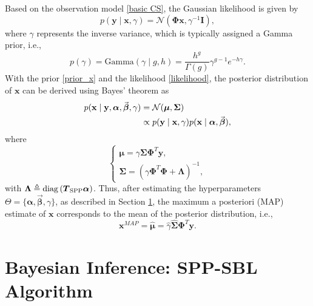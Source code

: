 \documentclass[lettersize,journal]{IEEEtran}
\DeclareMathOperator{\diag}{diag}
\theoremstyle{remark}
\begin{document}
Based on the observation model \eqref{basic CS}, the Gaussian likelihood is given by  
\begin{equation}
	p(\mathbf{y} \mid \mathbf{x}, \gamma)=\mathcal{N}(\boldsymbol{\Phi}\mathbf{x}, \gamma^{-1}\mathbf{I}),\label{likelihood}
\end{equation}  
where \( \gamma \) represents the inverse variance, which is typically assigned a Gamma prior, i.e., 
\begin{equation}
	p(\gamma)=\text{Gamma}(\gamma\mid g,h)=\frac{h^g}{\Gamma(g)}\gamma^{g-1} e^{-h\gamma}.\label{prior_gamma}
\end{equation}
With the prior \eqref{prior_x} and the likelihood \eqref{likelihood}, the posterior distribution of \( \mathbf{x} \) can be derived using Bayes' theorem as  
\begin{align}
	p(\mathbf{x} \mid \mathbf{y}, \boldsymbol{\alpha}, \vec{\boldsymbol{\beta}},\gamma) 
	&= \mathcal{N}(\boldsymbol{\mu}, \boldsymbol{\Sigma})\label{posterior_x}\\
	&\propto p(\mathbf{y} \mid \mathbf{x}, \gamma) p(\mathbf{x} \mid \boldsymbol{\alpha}, \vec{\boldsymbol{\beta}}),\notag
\end{align}  
where  
\begin{equation}
	\left\{
	\begin{array}{l}
		\boldsymbol{\mu} = \gamma\boldsymbol{\Sigma}\boldsymbol{\Phi}^T \mathbf{y}, \\  
		\boldsymbol{\Sigma} = \left(\gamma\boldsymbol{\Phi}^T\boldsymbol{\Phi}+\boldsymbol{\Lambda}\right)^{-1},\label{posterior}
	\end{array}
	\right.
\end{equation}  
with \( \boldsymbol{\Lambda} \triangleq \diag \left( \boldsymbol{T}_{\rm SPP} \boldsymbol{\alpha} \right) \). Thus, after estimating the hyperparameters \( \Theta = \{\boldsymbol{\alpha}, \vec{\boldsymbol{\beta}}, \gamma\} \), as described in Section \ref{inference}, the maximum a posteriori (MAP) estimate of \( \mathbf{x} \) corresponds to the mean of the posterior distribution, i.e.,  
\begin{equation}
	\mathbf{x}^{MAP}=\hat{\boldsymbol{\mu}}=\hat{\gamma}\hat{\boldsymbol{\Sigma}}\boldsymbol{\Phi}^T \mathbf{y}. \label{MAP}
\end{equation}

\section{Bayesian Inference: SPP-SBL Algorithm}\label{inference}
\end{document}
